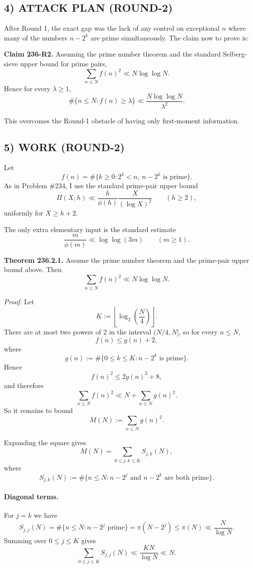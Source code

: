 \subsection*{4) ATTACK PLAN (ROUND-2)}

After Round 1, the exact gap was the lack of any control on exceptional $n$ where many of the numbers $n-2^k$ are prime simultaneously. The claim now to prove is:

\medskip
\noindent
\textbf{Claim 236-R2.} Assuming the prime number theorem and the standard Selberg-sieve upper bound for prime pairs,
\[
\sum_{n\le N} f(n)^2 \ll N\log\log N.
\]
Hence for every $\lambda\ge 1$,
\[
\#\{n\le N:f(n)\ge \lambda\}\ll \frac{N\log\log N}{\lambda^2}.
\]
\medskip

This overcomes the Round-1 obstacle of having only first-moment information.

\subsection*{5) WORK (ROUND-2)}

Let
\[
f(n)=\#\{k\ge 0:2^k<n,\ n-2^k\text{ is prime}\}.
\]
As in Problem \#234, I use the standard prime-pair upper bound
\[
\Pi(X;h)\ll \frac{h}{\phi(h)}\frac{X}{(\log X)^2}
\qquad (h\ge 2),
\]
uniformly for $X\ge h+2$.

The only extra elementary input is the standard estimate
\[
\frac{m}{\phi(m)}\ll \log\log(3m)
\qquad (m\ge 1).
\]

\medskip
\noindent
\textbf{Theorem 236.2.1.}
Assume the prime number theorem and the prime-pair upper bound above. Then
\[
\sum_{n\le N} f(n)^2 \ll N\log\log N.
\]

\emph{Proof.}
Let
\[
K:=\left\lfloor \log_2\!\left(\frac{N}{4}\right)\right\rfloor.
\]
There are at most two powers of $2$ in the interval $(N/4,N]$, so for every $n\le N$,
\[
f(n)\le g(n)+2,
\]
where
\[
g(n):=\#\{0\le k\le K: n-2^k\text{ is prime}\}.
\]
Hence
\[
f(n)^2\le 2g(n)^2+8,
\]
and therefore
\[
\sum_{n\le N} f(n)^2 \ll N + \sum_{n\le N} g(n)^2.
\]
So it remains to bound
\[
M(N):=\sum_{n\le N} g(n)^2.
\]

Expanding the square gives
\[
M(N)=\sum_{0\le j,k\le K} S_{j,k}(N),
\]
where
\[
S_{j,k}(N):=\#\{n\le N: n-2^j\text{ and }n-2^k\text{ are both prime}\}.
\]

\paragraph{Diagonal terms.}
For $j=k$ we have
\[
S_{j,j}(N)=\#\{n\le N:n-2^j\text{ prime}\}=\pi(N-2^j)\le \pi(N)\ll \frac{N}{\log N}.
\]
Summing over $0\le j\le K$ gives
\[
\sum_{0\le j\le K} S_{j,j}(N)\ll \frac{KN}{\log N}\ll N.
\]

